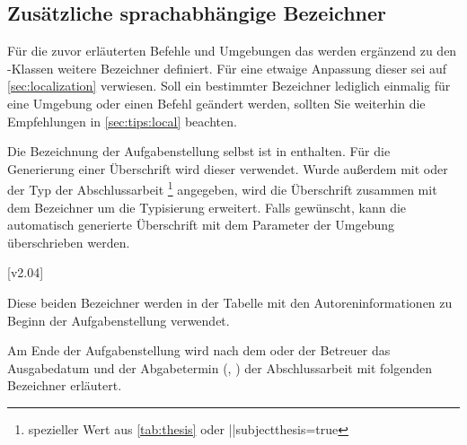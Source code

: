 \begin{DeclareEntity}{}
\section{%
  Zusätzliche sprachabhängige Bezeichner%
}
%
Für die zuvor erläuterten Befehle und Umgebungen das werden ergänzend zu den 
\TUDScript-Klassen weitere Bezeichner definiert. Für eine etwaige Anpassung 
dieser sei auf \autoref{sec:localization} verwiesen. Soll ein bestimmter 
Bezeichner lediglich einmalig für eine Umgebung oder einen Befehl geändert 
werden, sollten Sie weiterhin die Empfehlungen in \autoref{sec:tips:local} 
beachten.

\begin{Declaration}
  {}
\begin{Declaration}
  {}
\printdeclarationlist
%
Die Bezeichnung der Aufgabenstellung selbst ist in  enthalten. 
Für die Generierung einer Überschrift wird dieser verwendet. Wurde außerdem mit 
 oder  der Typ der Abschlussarbeit%
\footnote{%
  spezieller Wert aus \autoref{tab:thesis} oder \Option||{subjectthesis=true}%
}
angegeben, wird die Überschrift zusammen mit dem Bezeichner 
um die Typisierung erweitert. Falls gewünscht, kann die automatisch generierte 
Überschrift mit dem Parameter  der Umgebung 
 überschrieben werden.
\TermTable%
\end{Declaration}
\end{Declaration}

\begin{Declaration}
  {}
  [v2.04]
\begin{Declaration}
  {}
\printdeclarationlist
%
Diese beiden Bezeichner werden in der Tabelle mit den Autoreninformationen zu 
Beginn der Aufgabenstellung verwendet.
\TermTable%
\end{Declaration}
\end{Declaration}

\begin{Declaration}
  {}
\begin{Declaration}
  {}
\printdeclarationlist
%
Am Ende der Aufgabenstellung wird nach dem oder der Betreuer das Ausgabedatum 
und der Abgabetermin (, ) der Abschlussarbeit 
mit folgenden Bezeichner erläutert.
\TermTable%
\end{Declaration}
\end{Declaration}


\end{DeclareEntity}
